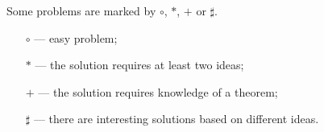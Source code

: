 \documentclass[twoside]{book}
\begin{document}
Some problems are marked by $\circ$, $*$, $+$ or $\sharp$.
\begin{itemize}
\item[$\circ$] --- easy problem;%
\item[$*$] --- the solution requires at least two ideas;%
\item[$+$] --- the solution requires knowledge of a theorem;%
\item[$\sharp$] --- there are interesting solutions based on different ideas.%
\end{itemize}











%
%


\backmatter
\newpage
{}
{\scriptsize

}
\sloppy
\printbibliography[heading=bibintoc]
\fussy
\end{document}

